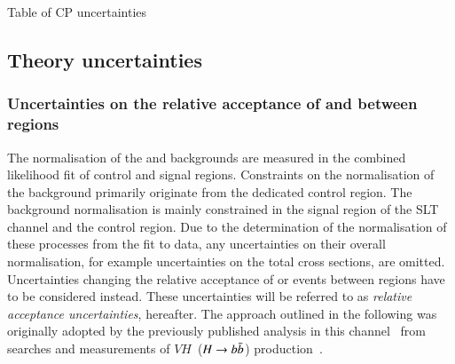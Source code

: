 \begin{table}[htbp]
  \centering

  

  \caption{Table of CP uncertainties}
  \label{tab:bla}
\end{table}




\subsection{Theory uncertainties}%
\label{sec:modelling_uncertainties}%
\label{sec:theory_uncertainties}




\subsubsection{Uncertainties on the relative acceptance of \ZHF and
  \ttbar between regions}

The normalisation of the \ZHF and \ttbar backgrounds are measured in
the combined likelihood fit of control and signal regions. Constraints
on the normalisation of the \ZHF background primarily originate from
the dedicated control region. The \ttbar background normalisation is
mainly constrained in the signal region of the \lephad SLT channel and
the \ZHF control region. Due to the determination of the normalisation
of these processes from the fit to data, any uncertainties on their
overall normalisation, for example uncertainties on the total cross
sections, are omitted. Uncertainties changing the relative acceptance
of \ZHF or \ttbar events between regions have to be considered
instead. These uncertainties will be referred to as \emph{relative
  acceptance uncertainties}, hereafter. The approach outlined in the
following was originally adopted by the previously published analysis
in this channel~\cite{HIGG-2016-16-witherratum} from searches and
measurements of $VH$~($H\to b\bar{b}$)
production~\cite{HIGG-2016-29,HIGG-2018-04,HIGG-2018-51}.

